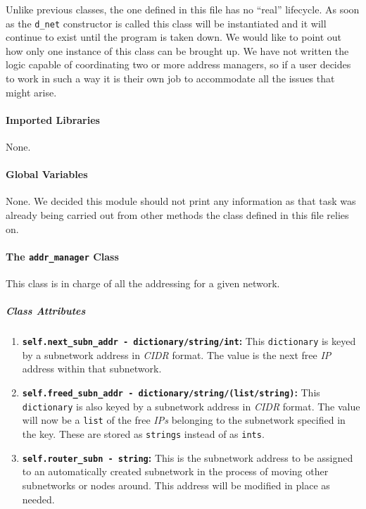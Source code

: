     Unlike previous classes, the one defined in this file has no ``real'' lifecycle. As soon as the \texttt{d\_net} constructor is called this class will be instantiated and it will continue to exist until the program is taken down. We would like to point out how only one instance of this class can be brought up. We have not written the logic capable of coordinating two or more address managers, so if a user decides to work in such a way it is their own job to accommodate all the issues that might arise.\\

    \paragraph{Imported Libraries}
        None.

    \paragraph{Global Variables}
        None. We decided this module should not print any information as that task was already being carried out from other methods the class defined in this file relies on.

    \paragraph{The \texttt{addr\_manager} Class}
        This class is in charge of all the addressing for a given network.

        \subparagraph{Class Attributes}
            \begin{enumerate}
                \item \textbf{\texttt{self.next\_subn\_addr - dictionary/string/int}:} This \texttt{dictionary} is keyed by a subnetwork address in \textit{CIDR} format. The value is the next free \textit{IP} address within that subnetwork.
                \item \textbf{\texttt{self.freed\_subn\_addr - dictionary/string/(list/string)}:} This \texttt{dictionary} is also keyed by a subnetwork address in \textit{CIDR} format. The value will now be a \texttt{list} of the free \textit{IPs} belonging to the subnetwork specified in the key. These are stored as \texttt{strings} instead of as \texttt{ints}.
                \item \textbf{\texttt{self.router\_subn - string}:} This is the subnetwork address to be assigned to an automatically created subnetwork in the process of moving other subnetworks or nodes around. This address will be modified in place as needed.
            \end{enumerate}

